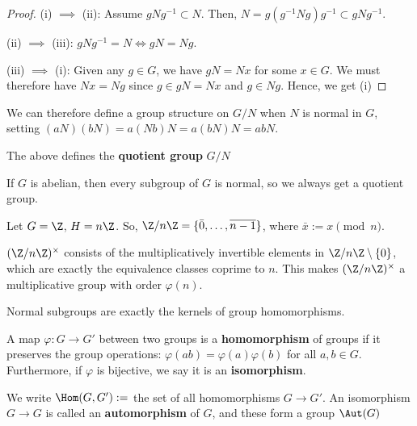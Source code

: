 \begin{proof}

    (i) $\implies$ (ii): Assume $gNg^{-1} \subset N$. Then, $N=g(g^{-1}Ng)g^{-1}\subset gNg^{-1}$.

    (ii) $\implies$ (iii): $gNg^{-1}=N \iff gN=Ng$.

    (iii) $\implies$ (i): Given any $g \in G$, we have $gN=Nx$ for some $x \in G$. We must therefore have $Nx=Ng$ since $g\in gN = Nx$ and $g \in Ng$. Hence, we get (i)
\end{proof}

We can therefore define a group structure on $G/N$ when $N$ is normal in $G$, setting $(aN)(bN)=a(Nb)N=a(bN)N=abN$.

\begin{defn}
    The above defines the \textbf{quotient group} $G/N$
\end{defn}

\begin{ex}
    If $G$ is abelian, then every subgroup of $G$ is normal, so we always get a quotient group.
\end{ex}

\begin{ex}
    Let $G=\Z$, $H=n\Z$. So, $\Z/n\Z=\{\bar 0,\dots,\overline{n-1}\}$, where $\bar x :=x \pmod n$.
\end{ex}

\begin{defn}
    $(\Z / n\Z)^\times$ consists of the multiplicatively invertible elements in $\Z/n\Z \setminus\{0\}$, which are exactly the equivalence classes coprime to $n$. This makes $(\Z/n\Z)^\times$ a multiplicative group with order $\varphi (n)$.
\end{defn}

\begin{notebox*}[Fact]
    Normal subgroups are exactly the kernels of group homomorphisms.
\end{notebox*}

\begin{defn}
    A map $\varphi:G \to G'$ between two groups is a \textbf{homomorphism} of groups if it preserves the group operations: $\varphi(ab)=\varphi(a)\varphi(b)$ for all $a,b \in G$. Furthermore, if $\varphi$ is bijective, we say it is an \textbf{isomorphism}.
\end{defn}

\begin{defn}
    We write $\Hom(G,G') :=$ the set of all homomorphisms $G \to G'$. An isomorphism $G\to G$ is called an \textbf{automorphism} of $G$, and these form a group $\Aut(G)$
\end{defn}


